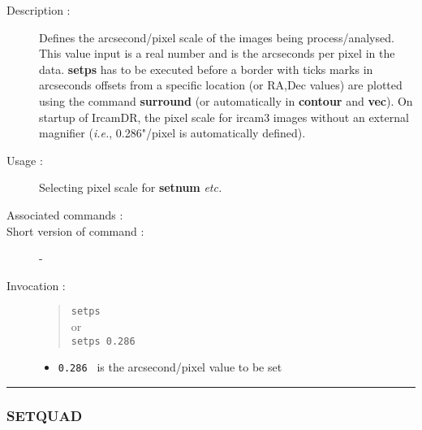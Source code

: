 \begin{description}

\item[Description :] Defines the arcsecond/pixel scale of the images
being process/analysed.  This value input is a real number and is the
arcseconds per pixel in the data.  {\bf setps} has to be executed
before a border with ticks marks in arcseconds offsets from a specific
location (or RA,Dec values) are plotted using the command {\bf
surround} (or automatically in {\bf contour} and {\bf vec}).  On
startup of {\sc IrcamDR}, the pixel scale for {\sc ircam3} images
without an external magnifier (\emph{i.e.}, 0.286"/pixel is
automatically defined).

\item[Usage :] Selecting pixel scale for {\bf setnum} \emph{etc.}
\item[Associated commands :] {\tt {}}
\item[Short version of command :] -
\item[Invocation :]

\begin{quote}{\tt  setps }\\
or \\
{\tt setps 0.286 }
\end{quote}

\begin{itemize}

\item {\tt 0.286 } is the arcsecond/pixel value to be set
\end{itemize}

\end{description}

\hrule 
\subsubsection*{\label{SETQUAD}SETQUAD}

